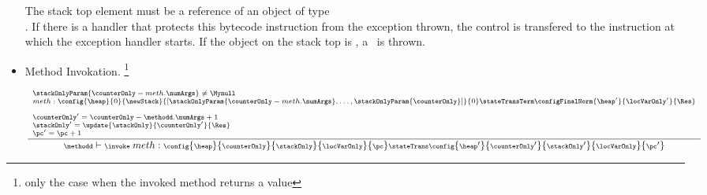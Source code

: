 \begin{itemize}
           The stack top element  must be a reference of an object of type \\ \Throwable. 
	  If there is a handler that protects this bytecode instruction from the exception thrown, the control is transfered
	  to the instruction at which the exception handler starts. %
	  If the object on the stack top is \Mynull, a \NullPointerExc \ is thrown. 

 \item Method Invokation. \invoke \footnote{ only the case when  the invoked method returns a value}
      
         $$ {\scriptsize \frac{\begin{array}{l} \stackOnlyParam{ \counterOnly - meth.\numArgs } \neq \Mynull   \\
	                         meth : %
			                        \config{\heap}       
                                                       {0}
						       {\newStack }
                                                       {\lbrack \stackOnlyParam{ \counterOnly - meth.\numArgs },\ldots ,\stackOnlyParam{ \counterOnly} \rbrack }
						       {0} 
						         \stateTransTerm 
							 \configFinalNorm{\heap'}{\locVarOnly'}{\Res}\\
                                                   \\
						   \counterOnly' = \counterOnly - \methodd.\numArgs + 1 \\
						   \stackOnly' = \update{\stackOnly}{\counterOnly'}{\Res} \\
						   \pc' = \pc + 1
			         \end{array} 	      
	         }	         
	         {\methodd \vdash \invoke \  meth :  \config{\heap}{\counterOnly}{\stackOnly}{\locVarOnly}{\pc} 
		                        \stateTrans  
					\config{\heap' }{\counterOnly'}{\stackOnly' }{\locVarOnly}{\pc'}} } $$
	  

\end{itemize}
